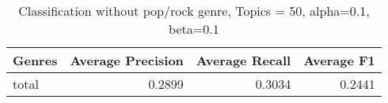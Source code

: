 \begin{table}[h]
\begin{tabular}{|l|r|r|r|}

\hline
\textbf{Genres} &  \textbf{Average Precision} & \textbf{Average Recall} & \textbf{Average F1} \\
\hline
total& 0.2899 	&0.3034 &	0.2441\\
\hline
\end{tabular}
\caption{Classification without pop/rock genre, Topics = 50, alpha=0.1, beta=0.1}
\end{table}